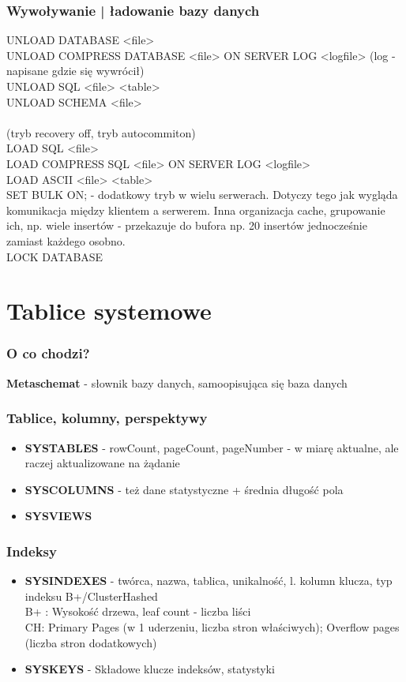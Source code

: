 \documentclass[a4paper,twoside]{article}
\begin{document}
  	\section*{Wywoływanie | ładowanie bazy danych} \noindent 
  	UNLOAD DATABASE <file>\\
  	UNLOAD COMPRESS DATABASE <file> ON SERVER LOG <logfile> (log - napisane gdzie się wywrócił)\\
  	UNLOAD SQL <file> <table>\\
  	UNLOAD SCHEMA <file>\\\\
  	(tryb recovery off, tryb autocommiton)\\
  	LOAD SQL <file>\\
  	LOAD COMPRESS SQL <file> ON SERVER LOG <logfile>\\
  	LOAD ASCII <file> <table>\\
  	SET BULK ON; - dodatkowy tryb w wielu serwerach. Dotyczy tego jak wygląda komunikacja między klientem a serwerem. Inna organizacja cache, grupowanie ich, np. wiele insertów - przekazuje do bufora np. 20 insertów jednocześnie zamiast każdego osobno.\\
  	LOCK DATABASE
  	
  	
  	\part*{Tablice systemowe}
  	\section*{O co chodzi?}
  	\textbf{Metaschemat} - słownik bazy danych, samoopisująca się baza danych
  	\section*{Tablice, kolumny, perspektywy}
  	\begin{itemize}
  		\item \textbf{SYSTABLES} - rowCount, pageCount, pageNumber - w miarę aktualne, ale raczej aktualizowane na żądanie
  		\item \textbf{SYSCOLUMNS} - też dane statystyczne + średnia długość pola
  		\item \textbf{SYSVIEWS}
  	\end{itemize}
  	\section*{Indeksy}
  	\begin{itemize}
  		\item \textbf{SYSINDEXES} - twórca, nazwa, tablica, unikalność, l. kolumn klucza, typ indeksu B+/ClusterHashed\\
  		B+ : Wysokość drzewa, leaf count - liczba liści\\
  		CH:  Primary Pages (w 1 uderzeniu, liczba stron właściwych); Overflow pages (liczba stron dodatkowych)
  		\item \textbf{SYSKEYS} - Składowe klucze indeksów, statystyki
  	\end{itemize}
\end{document}
